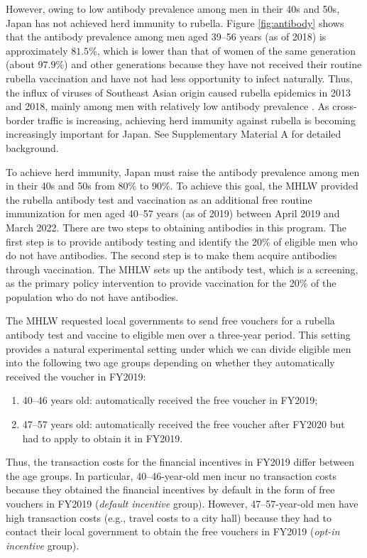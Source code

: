 \documentclass[
  11pt,
  a4paper
]{article}
\providecommand{\tightlist}{%
  \setlength{\itemsep}{0pt}\setlength{\parskip}{0pt}}
\begin{document}
However, owing to low antibody prevalence among men in their 40s and 50s, Japan has not achieved herd immunity to rubella. Figure \ref{fig:antibody} shows that the antibody prevalence among men aged 39--56 years (as of 2018) is approximately \(81.5\)\%, which is lower than that of women of the same generation (about \(97.9\)\%) and other generations because they have not received their routine rubella vaccination and have not had less opportunity to infect naturally. Thus, the influx of viruses of Southeast Asian origin caused rubella epidemics in 2013 and 2018, mainly among men with relatively low antibody prevalence \citep{NIID2019}. As cross-border traffic is increasing, achieving herd immunity against rubella is becoming increasingly important for Japan. See Supplementary Material A for detailed background.

To achieve herd immunity, Japan must raise the antibody prevalence among men in their 40s and 50s from 80\% to 90\%. To achieve this goal, the MHLW provided the rubella antibody test and vaccination as an additional free routine immunization for men aged 40--57 years (as of 2019) between April 2019 and March 2022. There are two steps to obtaining antibodies in this program. The first step is to provide antibody testing and identify the 20\% of eligible men who do not have antibodies. The second step is to make them acquire antibodies through vaccination. The MHLW sets up the antibody test, which is a screening, as the primary policy intervention to provide vaccination for the 20\% of the population who do not have antibodies.

The MHLW requested local governments to send free vouchers for a rubella antibody test and vaccine to eligible men over a three-year period. This setting provides a natural experimental setting under which we can divide eligible men into the following two age groups depending on whether they automatically received the voucher in FY2019:

\begin{enumerate}
\def\labelenumi{\arabic{enumi}.}
\tightlist
\item
  40--46 years old: automatically received the free voucher in FY2019;
\item
  47--57 years old: automatically received the free voucher after FY2020 but had to apply to obtain it in FY2019.
\end{enumerate}

Thus, the transaction costs for the financial incentives in FY2019 differ between the age groups. In particular, 40--46-year-old men incur no transaction costs because they obtained the financial incentives by default in the form of free vouchers in FY2019 (\emph{default incentive} group). However, 47--57-year-old men have high transaction costs (e.g., travel costs to a city hall) because they had to contact their local government to obtain the free vouchers in FY2019 (\emph{opt-in incentive} group).
\end{document}
